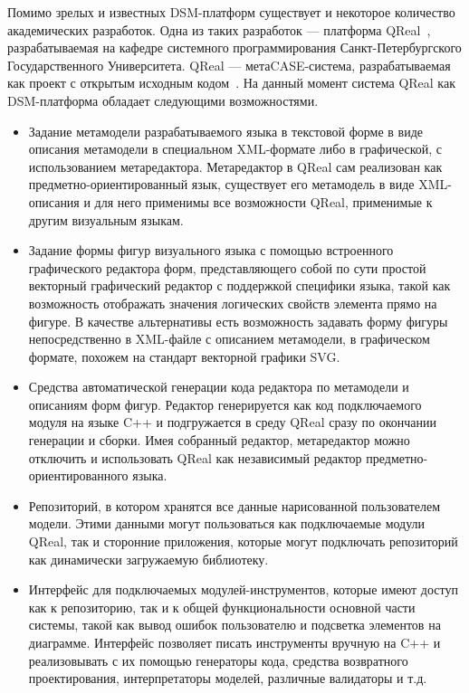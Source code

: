 \documentclass[a4paper]{article}
\begin{document}
Помимо зрелых и известных DSM-платформ существует и некоторое количество академических разработок. Одна из таких разработок --- платформа QReal~\cite{qReal}, разрабатываемая на кафедре системного программирования Санкт-Петербургского Государственного Университета. QReal --- метаCASE-система, разрабатываемая как проект с открытым исходным кодом~\cite{qRealGithub}. На данный момент система QReal как DSM-платформа обладает следующими возможностями.
\begin{itemize}
  \item Задание метамодели разрабатываемого языка в текстовой форме в виде описания метамодели в специальном XML-формате либо в графической, с использованием метаредактора. Метаредактор в QReal сам реализован как предметно-ориентированный язык, существует его метамодель в виде XML-описания и для него применимы все возможности QReal, применимые к другим визуальным языкам.
  \item Задание формы фигур визуального языка с помощью встроенного графического редактора форм, представляющего собой по сути простой векторный графический редактор с поддержкой специфики языка, такой как возможность отображать значения логических свойств элемента прямо на фигуре. В качестве альтернативы есть возможность задавать форму фигуры непосредственно в XML-файле с описанием метамодели, в графическом формате, похожем на стандарт векторной графики SVG.
  \item Средства автоматической генерации кода редактора по метамодели и описаниям форм фигур. Редактор генерируется как код подключаемого модуля на языке C++ и подгружается в среду QReal сразу по окончании генерации и сборки. Имея собранный редактор, метаредактор можно отключить и использовать QReal как независимый редактор предметно-ориентированного языка.
  \item Репозиторий, в котором хранятся все данные нарисованной пользователем модели. Этими данными могут пользоваться как подключаемые модули QReal, так и сторонние приложения, которые могут подключать репозиторий как динамически загружаемую библиотеку.
  \item Интерфейс для подключаемых модулей-инструментов, которые имеют доступ как к репозиторию, так и к общей функциональности основной части системы, такой как вывод ошибок пользователю и подсветка элементов на диаграмме. Интерфейс позволяет писать инструменты вручную на C++ и реализовывать с их помощью генераторы кода, средства возвратного проектирования, интерпретаторы моделей, различные валидаторы и т.д.
\end{itemize}
\end{document}
